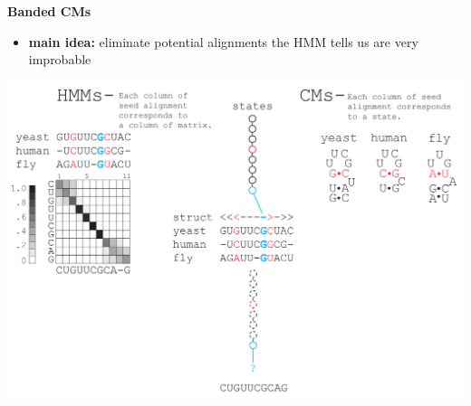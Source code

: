 \documentclass[landscape]{slides}
\begin{document}
\begin{slide}
\begin{center}
\large
\textbf{Banded CMs}
\end{center}
\medskip
\small
\begin{itemize}
\item
\textbf{main idea:} eliminate potential alignments the HMM tells us are very improbable
\end{itemize}
\begin{center}
\includegraphics[width=8in]{figs/post_hmm_to_cm_map2_layer11}
\end{center}
\vfill
\end{slide}
\end{document}
